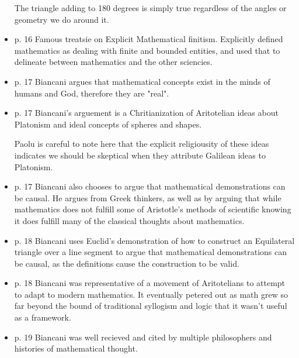 \documentclass{report}
\begin{document}
\begin{itemize}
\begin{mdframed}
            The triangle adding to 180 degrees is simply true
            regardless of the angles or geometry we do around
            it.
        \end{mdframed}
    \item p. 16 Famous treatsie on Explicit Mathematical
        finitism. Explicitly defined mathematics as dealing
        with finite and bounded entities, and used that to
        delineate between mathematics and the other sciencies.
    \item p. 17 Biancani argues that mathematical concepts
        exist in the minds of humans and God, therefore they
        are "real".
    \item p. 17 Biancani's arguement is a Chritianization of
        Aritotelian ideas about Platonism and ideal
        concepts of spheres and shapes.
        \begin{mdframed}
            Paolu is careful to note here that the explicit
            religiousity of these ideas indicates we should
            be skeptical when they attribute Galilean ideas
            to Platonism.
        \end{mdframed}
    \item p. 17 Biancani also chooses to argue that mathematical
        demonstrations can be causal. He argues from Greek
        thinkers, as well as by arguing that while mathematics
        does not fulfill some of Aristotle's methods of
        scientific knowing it does fulfill many of the
        classical thoughts about mathematics.
    \item p. 18 Biancani uses Euclid's demonstration of how
        to construct an Equilateral triangle over a line
        segment to argue that mathematical demonstrations
        can be causal, as the definitions cause the
        construction to be valid.
    \item p. 18 Biancani was representative of a movement
        of Aritotelians to attempt to adapt to modern
        mathematics. It eventually petered out as math
        grew so far beyond the bound of traditional syllogism
        and logic that it wasn't useful as a framework.
    \item p. 19 Biancani was well recieved and cited by
        multiple philosophers and histories of mathematical
        thought.


\end{itemize}
\end{document}
